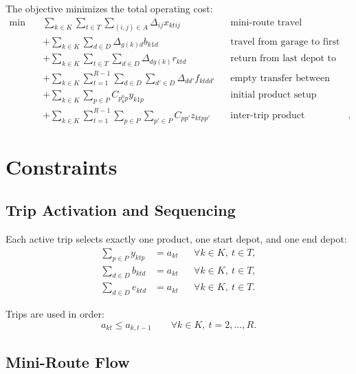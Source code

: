 \documentclass[11pt,a4paper]{article}
\begin{document}
The objective minimizes the total operating cost:
\begin{align}
\min \quad
& \sum_{k \in K}\sum_{t \in T}\sum_{(i,j)\in A}
    \Delta_{ij} x_{ktij}
    && \text{mini-route travel} \nonumber\\
& + \sum_{k \in K}\sum_{d \in D}
    \Delta_{g(k)d} b_{k1d}
    && \text{travel from garage to first depot} \nonumber\\
& + \sum_{k \in K}\sum_{t \in T}\sum_{d \in D}
    \Delta_{dg(k)} r_{ktd}
    && \text{return from last depot to garage} \nonumber\\
& + \sum_{k \in K}\sum_{t=1}^{R-1}\sum_{d \in D}\sum_{d' \in D}
    \Delta_{dd'} f_{ktdd'}
    && \text{empty transfer between depots} \nonumber\\
& + \sum_{k \in K}\sum_{p \in P}
    C_{p^0_k p} y_{k1p}
    && \text{initial product setup} \nonumber\\
& + \sum_{k \in K}\sum_{t=1}^{R-1}\sum_{p \in P}\sum_{p' \in P}
    C_{pp'} z_{ktpp'}
    && \text{inter-trip product preparation}.
\label{eq:objective}
\end{align}

\section{Constraints}

\subsection{Trip Activation and Sequencing}

Each active trip selects exactly one product, one start depot, and one end
depot:
\begin{align}
    \sum_{p \in P} y_{ktp} &= a_{kt}
        && \forall k \in K,\ t \in T, \label{eq:one-product}\\
    \sum_{d \in D} b_{ktd} &= a_{kt}
        && \forall k \in K,\ t \in T, \label{eq:one-start}\\
    \sum_{d \in D} e_{ktd} &= a_{kt}
        && \forall k \in K,\ t \in T. \label{eq:one-end}
\end{align}

Trips are used in order:
\begin{equation}
    a_{kt} \leq a_{k,t-1}
    \qquad \forall k \in K,\ t=2,\ldots,R.
\label{eq:ordered-trips}
\end{equation}

\subsection{Mini-Route Flow}
\end{document}
